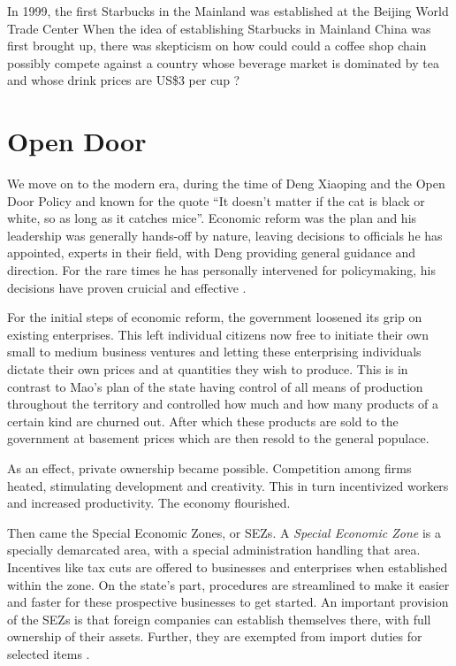 In 1999, the first Starbucks in the Mainland was established at the Beijing
World Trade Center When the idea of establishing Starbucks in Mainland China was
first brought up, there was skepticism on how could could a coffee shop chain
possibly compete against a country whose beverage market is dominated by tea and
whose drink prices are US\$3 per cup \autocite{adamy_eyeing_2006}?


\section{Open Door}


We move on to the modern era, during the time of Deng Xiaoping and the Open Door
Policy and known for the quote ``It doesn't matter if the cat is black or white, so
as long as it catches mice''. Economic reform was the plan and his leadership
was generally hands-off by nature, leaving decisions to officials he has
appointed, experts in their field, with Deng providing general guidance and
direction. For the rare times he has personally intervened for policymaking, his
decisions have proven cruicial and effective \autocite{naughton_deng_1993}.

For the initial steps of economic reform, the government loosened its grip on
existing enterprises. This left individual citizens now free to initiate their own
small to medium business ventures and letting these enterprising individuals dictate
their own prices and at quantities they wish to produce. This is in contrast to
Mao's plan of the state having control of all means of production throughout the
territory and controlled how much and how many products of a certain kind are
churned out. After which these products are sold to the government at basement
prices which are then resold to the general populace.

As an effect, private ownership became possible. Competition among firms heated,
stimulating development and creativity. This in turn incentivized workers and
increased productivity. The economy flourished.


Then came the Special Economic Zones, or SEZs. A \emph{Special Economic Zone} is a
specially demarcated area, with a special administration handling that area.
Incentives like tax cuts are offered to businesses and enterprises when
established within the zone. On the state's part, procedures are streamlined to
make it easier and faster for these prospective businesses to get started.
An important provision of the SEZs is that foreign companies can establish
themselves there, with full ownership of their assets. Further, they are
exempted from import duties for selected items
\autocites{zeng_how_2011}{jaggi_chinas_1996}.

